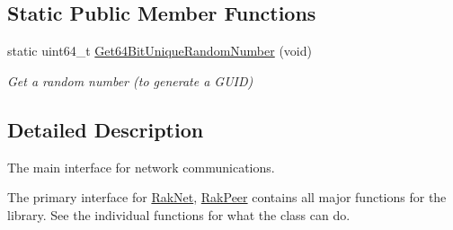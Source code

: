 \subsection*{Static Public Member Functions}
\begin{DoxyCompactItemize}
\item 
\hypertarget{class_rak_net_1_1_rak_peer_interface_a8e05f80c6e0de8f1b6e644700b7ce543}{static uint64\-\_\-t \hyperlink{class_rak_net_1_1_rak_peer_interface_a8e05f80c6e0de8f1b6e644700b7ce543}{Get64\-Bit\-Unique\-Random\-Number} (void)}\label{class_rak_net_1_1_rak_peer_interface_a8e05f80c6e0de8f1b6e644700b7ce543}

\begin{DoxyCompactList}\small\item\em Get a random number (to generate a G\-U\-I\-D) \end{DoxyCompactList}\end{DoxyCompactItemize}


\subsection{Detailed Description}
The main interface for network communications. 

The primary interface for \hyperlink{namespace_rak_net}{Rak\-Net}, \hyperlink{class_rak_net_1_1_rak_peer}{Rak\-Peer} contains all major functions for the library. See the individual functions for what the class can do. 

